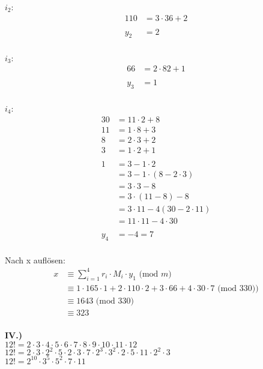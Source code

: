 \documentclass[12pt]{scrartcl}
\begin{document}
$i_2$:\\
\begin{align*}
    110 &= 3 \cdot 36 + 2\\
    \\
    y_2 &= 2\\
\end{align*}

$i_3$:\\
\begin{align*}
    66 &= 2 \cdot 82 + 1\\
    \\
    y_3 &= 1\\
\end{align*}

\newpage
$i_4$:\\
\begin{align*}
    30 &= 11 \cdot 2 + 8\\
    11 &= 1 \cdot 8 + 3\\
    8 &= 2 \cdot 3 + 2\\
    3 &= 1 \cdot 2 + 1\\
    \\
    1 &= 3 - 1 \cdot 2\\
      &= 3 - 1 \cdot (8 - 2 \cdot 3)\\
      &= 3 \cdot 3 - 8\\
      &= 3 \cdot (11 - 8) - 8\\
      &= 3 \cdot 11 - 4 (30 - 2 \cdot 11)\\
      &= 11 \cdot 11 - 4 \cdot 30\\
    \\
    y_4 &= -4 = 7\\
\end{align*}


Nach x auflösen:
\begin{align*}
    x &\equiv \sum_{i=1}^{4} r_i \cdot M_i \cdot y_1 \text{ (mod }m) \\
      &\equiv 1 \cdot 165 \cdot 1 + 2 \cdot 110 \cdot 2 + 3 \cdot 66 + 4 \cdot 30 \cdot 7 \text{ (mod }330) ) \\
      &\equiv 1643 \text{ (mod }330)\\
      &\equiv 323\\
\end{align*}


\textbf{IV.)}\\
$12! = 2 \cdot 3 \cdot 4 \cdot 5 \cdot 6 \cdot 7 \cdot 8 \cdot 9 \cdot 10 \cdot 11 \cdot 12$\\
$12! = 2 \cdot 3 \cdot 2^2 \cdot 5 \cdot 2 \cdot 3 \cdot 7 \cdot 2^3 \cdot 3^2 \cdot 2 \cdot 5 \cdot 11 \cdot 2^2 \cdot 3$\\
$12! = 2^{10} \cdot 3^5 \cdot 5^2 \cdot 7 \cdot 11$\\
\end{document}
